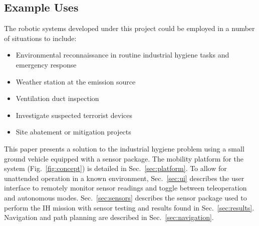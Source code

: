 \subsection{Example Uses}
The robotic systems developed under this project could be employed in a number of situations to include:
\begin{itemize}
	\item Environmental reconnaissance in routine industrial hygiene tasks and emergency response
	\item Weather station at the emission source
	\item Ventilation duct inspection
	\item Investigate suspected terrorist devices
	\item Site abatement or mitigation projects
\end{itemize}

This paper presents a solution to the industrial hygiene problem using a small ground vehicle equipped with a sensor package. The mobility platform for the system (Fig.~\ref{fig:concept}) is detailed in Sec.~\ref{sec:platform}. To allow for unattended operation in a known environment, Sec.~\ref{sec:ui} describes the user interface to remotely monitor sensor readings and toggle between teleoperation and autonomous modes. Sec.~\ref{sec:sensors} describes the sensor package used to perform the IH mission with sensor testing and results found in Sec.~\ref{sec:results}. Navigation and path planning are described in Sec.~\ref{sec:navigation}.
